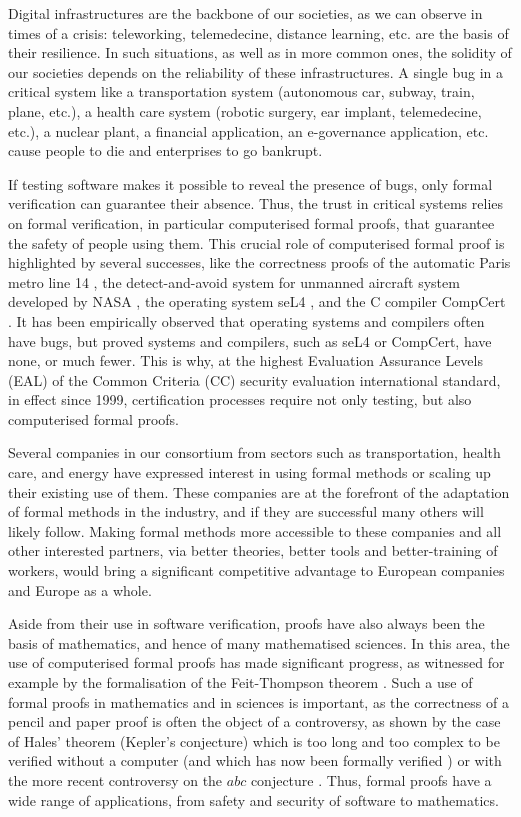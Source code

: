 \thispagestyle{empty}


Digital infrastructures are the backbone of our societies, as we can
observe in times of a crisis: teleworking, telemedecine, distance
learning, etc. are the basis of their resilience.  In such situations,
as well as in more common ones, the solidity of our societies depends
on the reliability of these infrastructures.  A single bug in a
critical system like a transportation system (autonomous car, subway,
train, plane, etc.), a health care system (robotic surgery, ear implant,
telemedecine, etc.), a nuclear plant, a financial application,
an e-governance application, etc.  cause people to die and enterprises to
go bankrupt.

If testing software makes it possible to reveal the presence of bugs,
only formal verification can guarantee their absence. Thus, the trust
in critical systems relies on formal verification, in particular
computerised formal proofs, that guarantee the safety of people using
them. This crucial role of computerised formal proof is highlighted by
several successes, like the correctness proofs of the automatic Paris
metro line 14 \cite{Behm98,Lecomte17}, the detect-and-avoid system for
unmanned aircraft system developed by NASA \cite{Munoz16}, the
operating system seL4 \cite{Klein09}, and the C compiler CompCert
\cite{Leroy06}.  It has been empirically observed that operating
systems and compilers often have bugs, but proved systems and
compilers, such as seL4 or CompCert, have none, or much fewer.  This
is why, at the highest Evaluation Assurance Levels (EAL) of the Common
Criteria (CC) security evaluation international standard, in effect
since 1999, certification processes require not only testing, but also
computerised formal proofs.

Several companies in our consortium from sectors such as
transportation, health care, and energy have expressed interest in
using formal methods or scaling up their existing use of them. These
companies are at the forefront of the adaptation of formal methods in
the industry, and if they are successful many others will likely
follow. Making formal methods more accessible to these companies
and all other interested partners, via better theories, better tools
and better-training of workers, would bring a significant
competitive advantage to European companies and Europe as a whole.

Aside from their use in software verification, proofs have also always
been the basis of mathematics, and hence of many mathematised
sciences. In this area, the use of computerised formal proofs has made
significant progress, as witnessed for example by the formalisation of the
Feit-Thompson theorem \cite{Gonthier13}.  Such a use of formal proofs
in mathematics and in sciences is important, as the correctness of a
pencil and paper proof is often the object of a controversy, as shown
by the case of Hales' theorem (Kepler's conjecture) which is too long
and too complex to be verified without a computer (and which has now
been formally verified \cite{Hales17}) or with the more recent
controversy on the $abc$ conjecture \cite{Castelvecchi}. Thus, formal
proofs have a wide range of applications, from safety and security of
software to mathematics.

